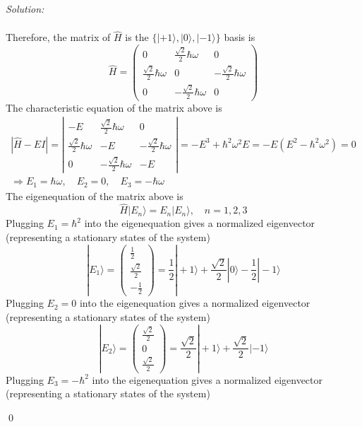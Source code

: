 \documentclass[12pt,a4paper]{article}
\newenvironment{sol}
    {\emph{Solution:}
    }
    {
    \qed
    }
\begin{document}
\begin{sol}
\begin{itemize}
\begin{gather}
\end{gather}
Therefore, the matrix of $\hat{H}$ is the $\{|+1\rangle,|0\rangle,|-1\rangle\}$ basis is
\begin{equation}
\hat{H}=\left(\begin{array}{ccc}
0&\frac{\sqrt{2}}{2}\hbar\omega&0\\
\frac{\sqrt{2}}{2}\hbar\omega&0&-\frac{\sqrt{2}}{2}\hbar\omega\\
0&-\frac{\sqrt{2}}{2}\hbar\omega&0
\end{array}\right)
\end{equation}
The characteristic equation of the matrix above is
\begin{gather}
|\hat{H}-EI|=\left|\begin{array}{ccc}
-E&\frac{\sqrt{2}}{2}\hbar\omega&0\\
\frac{\sqrt{2}}{2}\hbar\omega&-E&-\frac{\sqrt{2}}{2}\hbar\omega\\
0&-\frac{\sqrt{2}}{2}\hbar\omega&-E
\end{array}\right|=-E^3+\hbar^2\omega^2E=-E(E^2-\hbar^2\omega^2)=0\\
\Longrightarrow E_1=\hbar\omega,\quad E_2=0,\quad E_3=-\hbar\omega
\end{gather}
The eigenequation of the matrix above is
\begin{equation}
\hat{H}|E_n\rangle=E_n|E_n\rangle,\quad n=1,2,3
\end{equation}
Plugging $E_1=\hbar^2$ into the eigenequation gives a normalized eigenvector (representing a stationary states of the system)
\begin{equation}
|E_1\rangle=\left(\begin{array}{c}
\frac{1}{2}\\
\frac{\sqrt{2}}{2}\\
-\frac{1}{2}
\end{array}\right)=\frac{1}{2}|+1\rangle+\frac{\sqrt{2}}{2}|0\rangle-\frac{1}{2}|-1\rangle
\end{equation}
Plugging $E_2=0$ into the eigenequation gives a normalized eigenvector (representing a stationary states of the system)
\begin{equation}
|E_2\rangle=\left(\begin{array}{c}
\frac{\sqrt{2}}{2}\\
0\\
\frac{\sqrt{2}}{2}
\end{array}\right)=\frac{\sqrt{2}}{2}|+1\rangle+\frac{\sqrt{2}}{2}|-1\rangle
\end{equation}
Plugging $E_3=-\hbar^2$ into the eigenequation gives a normalized eigenvector (representing a stationary states of the system)

\end{itemize}
\end{sol}
\end{document}
